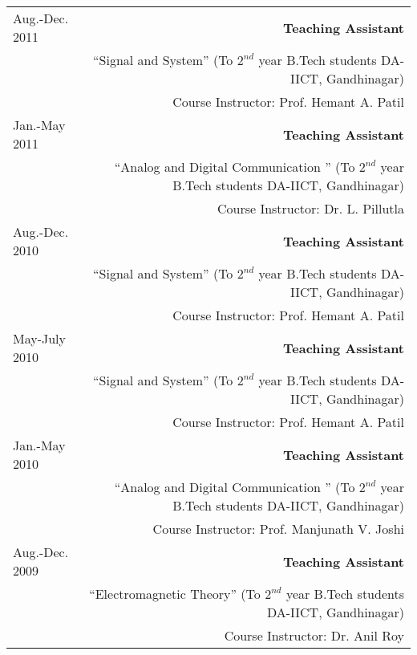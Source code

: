 \documentclass[10pt]{article}
\begin{document}
\begin{tabular}{L!{\VRule}R}
Aug.-Dec. 2011&\textbf{Teaching Assistant}\\&``Signal and System'' (To $ 2^{nd} $ year B.Tech students DA-IICT, Gandhinagar)\\& Course Instructor: Prof. Hemant A. Patil\vspace{0.2cm}\\
Jan.-May 2011&\textbf{Teaching Assistant}\\&``Analog and Digital Communication '' (To $ 2^{nd} $ year B.Tech students DA-IICT, Gandhinagar)\\& Course Instructor: Dr. L. Pillutla\vspace{0.2cm}\\
Aug.-Dec. 2010&\textbf{Teaching Assistant}\\&``Signal and System'' (To $ 2^{nd} $ year B.Tech students DA-IICT, Gandhinagar)\\& Course Instructor: Prof. Hemant A. Patil\vspace{0.2cm}\\
May-July 2010&\textbf{Teaching Assistant}\\&``Signal and System'' (To $ 2^{nd} $ year B.Tech students DA-IICT, Gandhinagar)\\& Course Instructor: Prof. Hemant A. Patil\vspace{0.2cm}\\
Jan.-May 2010&\textbf{Teaching Assistant}\\&``Analog and Digital Communication '' (To $ 2^{nd} $ year B.Tech students DA-IICT, Gandhinagar)\\& Course Instructor: Prof. Manjunath V. Joshi\vspace{0.2cm}\\
Aug.-Dec. 2009&\textbf{Teaching Assistant}\\&``Electromagnetic Theory'' (To $ 2^{nd} $ year B.Tech students DA-IICT, Gandhinagar)\\& Course Instructor: Dr. Anil Roy\\
\end{tabular}
\end{document}

